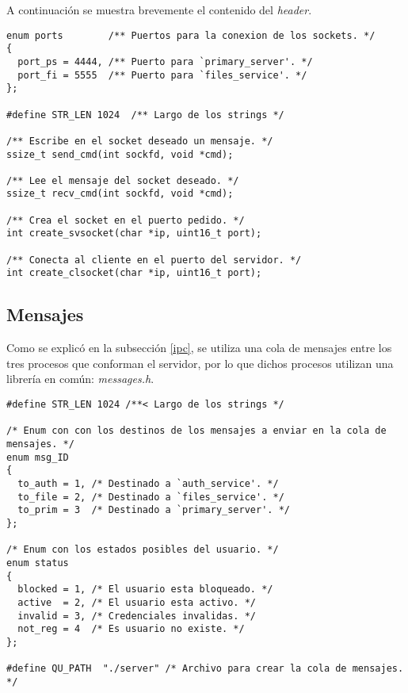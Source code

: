 \documentclass[12pt,a4paper]{article}
\begin{document}
\newpage

A continuación se muestra brevemente el contenido del \emph{header}.

\begin{lstlisting}[caption={\emph{Header} para el uso de \emph{sockets}.}, label={socket}, language=Ce]
enum ports        /** Puertos para la conexion de los sockets. */
{
  port_ps = 4444, /** Puerto para `primary_server'. */
  port_fi = 5555  /** Puerto para `files_service'. */
};

#define STR_LEN 1024  /** Largo de los strings */

/** Escribe en el socket deseado un mensaje. */
ssize_t send_cmd(int sockfd, void *cmd);

/** Lee el mensaje del socket deseado. */
ssize_t recv_cmd(int sockfd, void *cmd);

/** Crea el socket en el puerto pedido. */
int create_svsocket(char *ip, uint16_t port);

/** Conecta al cliente en el puerto del servidor. */
int create_clsocket(char *ip, uint16_t port);
\end{lstlisting}

\subsection{Mensajes}
\label{msg_h}
Como se explicó en la subsección \ref{ipc}, se utiliza una cola de mensajes
entre los tres procesos que conforman el servidor, por lo que dichos procesos
utilizan una librería en común: \emph{messages.h}.

\begin{lstlisting}[caption={\emph{Header} para el uso de la cola de mensajes.}, label={msgql}, language=Ce]
#define STR_LEN 1024 /**< Largo de los strings */

/* Enum con con los destinos de los mensajes a enviar en la cola de mensajes. */
enum msg_ID
{
  to_auth = 1, /* Destinado a `auth_service'. */
  to_file = 2, /* Destinado a `files_service'. */
  to_prim = 3  /* Destinado a `primary_server'. */
};

/* Enum con los estados posibles del usuario. */
enum status
{
  blocked = 1, /* El usuario esta bloqueado. */
  active  = 2, /* El usuario esta activo. */
  invalid = 3, /* Credenciales invalidas. */
  not_reg = 4  /* Es usuario no existe. */
};

#define QU_PATH  "./server" /* Archivo para crear la cola de mensajes. */
\end{lstlisting}
\end{document}
